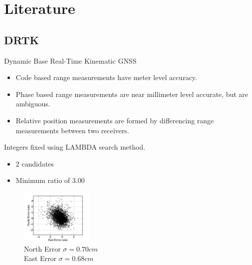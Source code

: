 \documentclass{beamer}
\begin{document}

\section{Literature}

  \subsection{DRTK}

    \begin{frame}{Dynamic Base Real-Time Kinematic GNSS}
      \begin{itemize} \footnotesize
        \item Code based range measurements have meter level accuracy.
        \item Phase based range measurements are near millimeter level accurate, but are ambiguous.
        \item Relative position measurements are formed by differencing range measurements between two receivers.
      \end{itemize}
      \begin{minipage}{0.45\linewidth}
        Integers fixed using LAMBDA search method.
        \begin{itemize} \footnotesize
          \item 2 candidates
          \item Minimum ratio of 3.00
        \end{itemize}
      \end{minipage}
      \begin{minipage}{0.45\linewidth}
        \begin{figure} \centering
        \includegraphics[width=3.5cm]{../graphics/drtk_errors.png}
        \caption{ \footnotesize North Error $\sigma=0.70cm$\\East Error $\sigma=0.68cm$ }
        \end{figure}
      \end{minipage}
    \end{frame}
\end{document}
